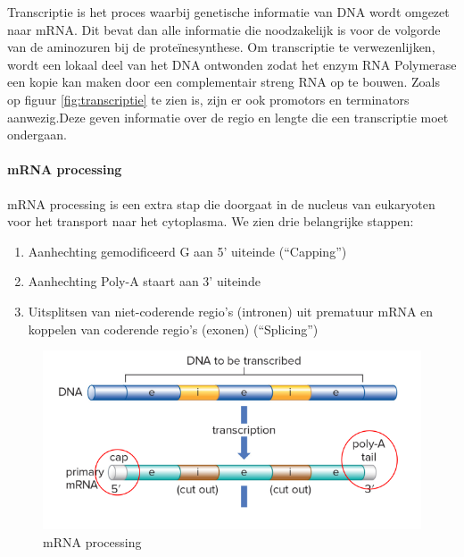 \documentclass[a4paper,kul]{kulakarticle} %
\begin{document}
Transcriptie is het proces waarbij genetische informatie van DNA wordt omgezet naar mRNA. Dit bevat dan alle informatie die noodzakelijk is voor de volgorde van de aminozuren bij de proteïnesynthese. Om transcriptie te verwezenlijken, wordt een lokaal deel van het DNA ontwonden zodat het enzym RNA Polymerase een kopie kan maken door een complementair streng RNA op te bouwen. Zoals op figuur \ref{fig:transcriptie} te zien is, zijn er ook promotors en terminators aanwezig.Deze geven informatie over de regio en lengte die een transcriptie moet ondergaan. 
\newpage
\paragraph{mRNA processing}
mRNA processing is een extra stap die doorgaat in de nucleus van eukaryoten voor het transport naar het cytoplasma. We zien drie belangrijke stappen:
\begin{enumerate}
	\item Aanhechting gemodificeerd G aan 5’ uiteinde (“Capping”)
	\item Aanhechting Poly-A staart aan 3’ uiteinde
	\item Uitsplitsen van niet-coderende regio’s (intronen) uit prematuur mRNA en
	koppelen van coderende regio’s (exonen) (“Splicing”) 
\end{enumerate}
\begin{figure}[h]
	\centering
	\includegraphics[width=0.7\linewidth]{mRNAProcessing}
	\caption[mRNA processing]{mRNA processing}
	\label{fig:mrnaprocessing}
\end{figure}
\newpage
\end{document}
